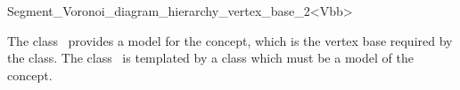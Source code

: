 


\begin{ccRefClass}{Segment_Voronoi_diagram_hierarchy_vertex_base_2<Vbb>}


\ccDefinition

The class \ccRefName\ provides a model for the
 concept, which is the
vertex base required by the
 class. The class
\ccRefName\ is templated by a class  which must be a model
of the  concept.


\ccInheritsFrom
{}

\ccIsModel
{}






\end{ccRefClass}
